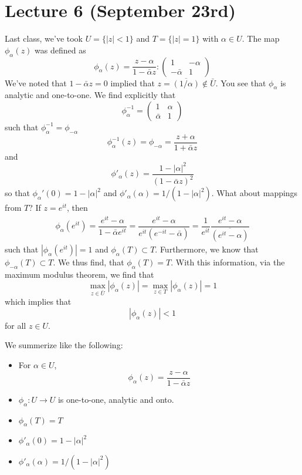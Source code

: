 \section{Lecture 6 (September 23rd)}
\begin{recall}
Last class, we've took $U=\{|z|<1 \}$ and $T=\{|z|=1\}$ with $\alpha \in U$. The map $\phi _{\alpha }(z)$ was defined as
\[\phi_{\alpha }(z)=\dfrac{z-\alpha }{1-\bar{\alpha }z}:\begin{pmatrix}
1&-\alpha \\-\bar{\alpha }&1
\end{pmatrix}
\]
We've noted that $1-\bar{\alpha }z=0$ implied that $z=\overline{(1/\alpha )}\notin \bar{U}$. You see that $\phi _{\alpha }$ is analytic and one-to-one. We find explicitly that
\[\phi _{\alpha }^{-1}=\begin{pmatrix}
1&\alpha \\\bar{\alpha }&1
\end{pmatrix}
\]
such that $\phi ^{-1}_{\alpha }=\phi _{-\alpha }$
\[\phi ^{-1}_{\alpha }(z)=\phi _{-\alpha }=\dfrac{z+\alpha }{1+\bar{\alpha }z}\]
and
\[\phi '_{\alpha }(z)=\dfrac{1-|\alpha |^2}{(1-\bar{\alpha }z)^2}\]
so that $\phi _{\alpha }'(0)=1-|\alpha |^2$ and $\phi '_{\alpha }(\alpha )=1/(1-|\alpha |^2)$. What about mappings from $T$? If $z=e^{it}$, then
\[\begin{align*}
\phi _{\alpha }(e^{it})=\dfrac{e^{it}-\alpha }{1-\bar{\alpha }e^{it}}=\dfrac{e^{it}-\alpha }{e^{it}(e^{-it}-\bar{\alpha })}=\dfrac{1}{e^{it}}\dfrac{e^{it}-\alpha }{\overline{(e^{it}-\alpha )}}
\end{align*}\]
such that $|\phi _{\alpha }(e^{it})|=1$ and $\phi _{\alpha }(T)\subset T$. Furthermore, we know that $\phi _{-\alpha }(T)\subset T$. We thus find, that $\phi _{\alpha }(T)=T$. With this information, via the maximum modulus theorem, we find that
\[\mathop{\mathrm{max}}_{z\in \bar{U}}|\phi_{\alpha }(z)|=\mathop{\mathrm{max}}_{z\in T}|\phi _{\alpha }(z)|=1  \]
which implies that
\[|\phi _{\alpha }(z)|<1\]
for all $z\in U$. 
\end{recall}
\vspace{2ex}
\begin{rmk}
We summerize like the following:
\begin{itemize}
\item[(i)] For $\alpha \in U$,
\[\phi _{\alpha }(z)=\dfrac{z-\alpha }{1-\bar{\alpha }z}\]
\item[(ii)] $\phi _{\alpha }:U\rightarrow U$ is one-to-one, analytic and onto.
\item[(iii)] $\phi _{\alpha }(T)=T$
\item[(iv)] $\phi '_{\alpha }(0)=1-|\alpha |^2$
\item[(v)] $\phi '_{\alpha }(\alpha )=1/(1-|\alpha |^2)$
\end{itemize}
\end{rmk}
